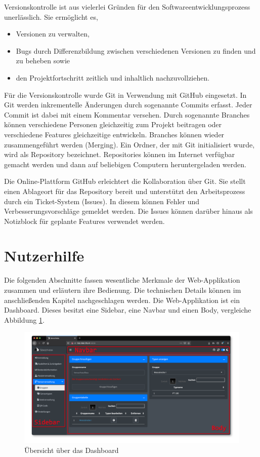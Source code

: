 \documentclass[
]{article}
\providecommand{\tightlist}{%
  \setlength{\itemsep}{0pt}\setlength{\parskip}{0pt}}
\begin{document}
Versionskontrolle ist aus vielerlei Gründen für den Softwareentwicklungsprozess unerlässlich. Sie ermöglicht es,

\begin{itemize}
\tightlist
\item
  Versionen zu verwalten,
\item
  Bugs durch Differenzbildung zwischen verschiedenen Versionen zu finden und zu beheben sowie
\item
  den Projektfortschritt zeitlich und inhaltlich nachzuvollziehen.
\end{itemize}

Für die Versionskontrolle wurde Git in Verwendung mit GitHub eingesetzt. In Git werden inkrementelle Änderungen durch sogenannte Commits erfasst. Jeder Commit ist dabei mit einem Kommentar versehen. Durch sogenannte Branches können verschiedene Personen gleichzeitig zum Projekt beitragen oder verschiedene Features gleichzeitige entwickeln. Branches können wieder zusammengeführt werden (Merging). Ein Ordner, der mit Git initialisiert wurde, wird als Repository bezeichnet. Repositories können im Internet verfügbar gemacht werden und dann auf beliebigen Computern heruntergeladen werden.

Die Online-Plattform GitHub erleichtert die Kollaboration über Git. Sie stellt einen Ablageort für das Repository bereit und unterstützt den Arbeitsprozess durch ein Ticket-System (Issues). In diesem können Fehler und Verbesserungsvorschläge gemeldet werden. Die Issues können darüber hinaus als Notizblock für geplante Features verwendet werden.

\hypertarget{user-guide}{%
\section{Nutzerhilfe}\label{user-guide}}

Die folgenden Abschnitte fassen wesentliche Merkmale der Web-Applikation zusammen und erläutern ihre Bedienung. Die technischen Details können im anschließenden Kapitel nachgeschlagen werden. Die Web-Applikation ist ein Dashboard. Dieses besitzt eine Sidebar, eine Navbar und einen Body, vergleiche Abbildung \ref{fig:app-overview}.

\begin{figure}
\centering
\includegraphics{./img/app_overview.png}
\caption{\label{fig:app-overview}Übersicht über das Dashboard}
\end{figure}
\end{document}

